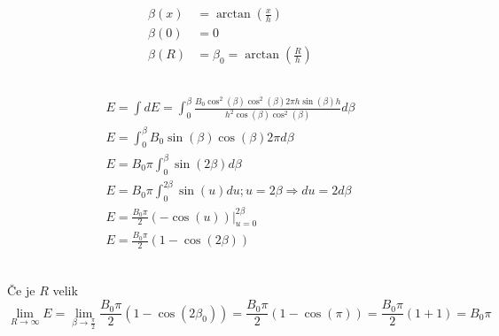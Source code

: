 \documentclass[a4paper,12pt]{article}
\begin{document}
\subsection{}
\begin{align}
    \beta(x) & = \arctan\left(\frac{x}{h}\right)           \\
    \beta(0) & = 0                                         \\
    \beta(R) & = \beta_0 = \arctan\left(\frac{R}{h}\right)
\end{align}

\subsection{}
\begin{align}
    E = \int dE = \int_0^{\beta} \frac{B_0 \cos^2(\beta) \cos^2(\beta) 2\pi h \sin(\beta) h}{h^2 \cos(\beta) \cos^2(\beta)} d\beta \\
    E = \int_0^\beta B_0 \sin(\beta) \cos(\beta) 2 \pi d\beta                                                                      \\
    E = B_0 \pi \int_0^{\beta} \sin(2 \beta) d\beta                                                                                \\
    E = B_0 \pi \int_0^{2 \beta} \sin(u) du; u = 2\beta \Rightarrow du = 2 d\beta                                                  \\
    E = \frac{B_0 \pi}{2} (-\cos(u)) \vert_{u=0}^{2\beta}                                                                          \\
    E = \frac{B_0 \pi}{2} (1 - \cos(2\beta))                                                                                       \\
\end{align}

\subsection{}
Če je $R$ velik
\begin{equation}
    \lim_{R \to \infty} E = \lim_{\beta \to \frac{\pi}{2}} \frac{B_0 \pi}{2} (1 - \cos(2\beta_0)) = \frac{B_0 \pi}{2} (1 - \cos(\pi)) = \frac{B_0 \pi}{2} (1 + 1) = B_0 \pi
\end{equation}

\newpage
\end{document}

